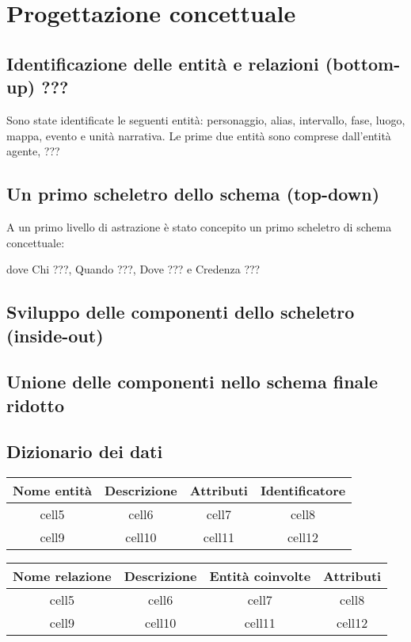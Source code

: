 \documentclass{article}
\begin{document}
\section{Progettazione concettuale}

\subsection{Identificazione delle entità e relazioni (bottom-up) ???}
Sono state identificate le seguenti entità: personaggio, alias, intervallo,
fase, luogo, mappa, evento e unità narrativa.
Le prime due entità sono comprese dall'entità agente, ???
\subsection{Un primo scheletro dello schema (top-down)}
A un primo livello di astrazione è stato concepito un primo scheletro di schema
concettuale:

dove Chi ???, Quando ???, Dove ??? e Credenza ???
\subsection{Sviluppo delle componenti dello scheletro (inside-out)}

\subsection{Unione delle componenti nello schema finale ridotto}

\subsection{Dizionario dei dati}

\begin{tabular}{ |c|c|c|c| }
	\hline
	\textbf{Nome entità} & \textbf{Descrizione} & \textbf{Attributi} & \textbf{Identificatore} \\
	\hline
	cell5                & cell6                & cell7              & cell8                   \\
	\hline
	cell9                & cell10               & cell11             & cell12                  \\
	\hline
\end{tabular}

\begin{tabular}{ |c|c|c|c| }
	\hline
	\textbf{Nome relazione} & \textbf{Descrizione} & \textbf{Entità coinvolte} & \textbf{Attributi} \\
	\hline
	cell5                   & cell6                & cell7                     & cell8              \\
	\hline
	cell9                   & cell10               & cell11                    & cell12             \\
	\hline
\end{tabular}
\end{document}
